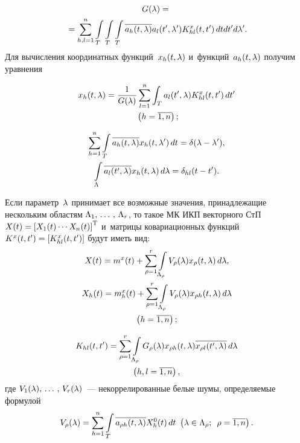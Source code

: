 \begin{multicols}{2}
\vspace*{-4pt}

\noindent
   \begin{multline*}
    G(\lambda) ={}\\
    {}= \sum\limits_{h,l=1}^n \int\limits_T \int\limits_T \int\limits_T \overline{a_h (t,\lambda)} a_l (t',\lambda') K_{hl}^x (t,t')\, dtdt'd\lambda'.
\end{multline*}
Для вычисления координатных функций~$x_h (t,\lambda)$ и~функций~$a_h (t,\lambda)$ 
получим  уравнения

\vspace*{-4pt}

\noindent
    \begin{multline}
    x_h (t,\lambda) =\displaystyle\frac{\displaystyle 1\mathstrut}{\displaystyle G(\lambda)\mathstrut} \sum\limits_{l=1}^n \int_T a_l (t',\lambda) K_{hl}^x 
(t,t') \,dt' \\\
 \left(h=\overline{1,n}\right);
\label{e2.3-s2}
\end{multline}

\vspace*{-12pt}

\noindent
\begin{multline}
\sum\limits_{h=1}^n \int\limits_T \overline{a_h(t,\lambda)} x_h (t, \lambda') \,dt = \delta (\lambda-\lambda'),\\
    \int\limits_\Lambda \overline{a_l(t',\lambda)} x_h (t, \lambda)\, d\lambda = \delta_{hl} (t-t').
    \label{e2.4-s2}
    \end{multline}
    

Если параметр~$\lambda$ принимает все возможные значения, принадлежащие нескольким 
областям $\Lambda_1,\,\ldots\,,\, \Lambda_r$, то такое МК ИКП 
векторного СтП $X(t) \hm=\lk X_1(t) \cdots X_n(t)\rk^{\mathrm{T}}$ и~матрицы ковариационных 
функций $K^x (t,t') \hm= \lk K_{hl}^x (t,t')\rk$  будут иметь вид:
  \begin{multline}
    X(t) = m^x (t) +\sum\limits_{\rho =1}^r \int\limits_{\Lambda_\rho} V_\rho (\lambda) x_\rho 
(t,\lambda) \,d\lambda,
\\
    X_h(t) = m_h^x(t) +\sum\limits_{\rho =1}^r \int\limits_{\Lambda_\rho} V_\rho (\lambda) 
x_{\rho h} (t,\lambda) \,d\lambda\\
 \left(h=\overline{1,n}\right);
\label{e2.5-s2}
\end{multline}

\vspace*{-12pt}

\noindent
        \begin{multline}
    K_{hl}(t, t') =\sum\limits_{\rho =1}^r \int\limits_{\Lambda_\rho} G_\rho (\lambda) x_{\rho h} (t,\lambda)\overline{x_{\rho l} (t',\lambda)}\, d\lambda\\ 
\left(h,l=\overline{1,n}\right),
\label{e2.6-s2}
\end{multline}
где $V_1(\lambda),\,\ldots\,,\, V_r(\lambda)$~--- некоррелированные белые шумы, определяемые 
формулой
        \begin{equation*}
    V_\rho (\lambda) = \sum\limits_{h=1}^n  \int\limits_{T} \overline{a_{\rho h} (t,\lambda)} X_h^0 
(t) \,dt\  \left(\lambda\in \Lambda_\rho; \enskip \rho=\overline{1,n}\right).
\end{equation*}


\end{multicols}
